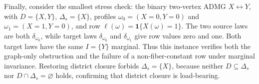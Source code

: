 Finally, consider the smallest stress check: the binary two-vertex ADMG \(X\leftrightarrow Y\), with \(D=\{X,Y\}\), \(\Delta_s=\{X\}\), profiles \(\omega_0=(X=0,Y=0)\) and \(\omega_1=(X=1,Y=0)\), and row \(\ell(\omega)=\mathbf 1\{X(\omega)=1\}\).  The two source laws are both \(\delta_{\omega_0}\), while target laws \(\delta_{\omega_0}\) and \(\delta_{\omega_1}\) give row values zero and one.  Both target laws have the same \(I=\{Y\}\) marginal.  Thus this instance verifies both the graph-only obstruction and the failure of a non-fiber-constant row under marginal invariance.  Restoring district closure forbids \(\Delta_s=\{X\}\), because neither \(D\subseteq\Delta_s\) nor \(D\cap\Delta_s=\varnothing\) holds, confirming that district closure is load-bearing.